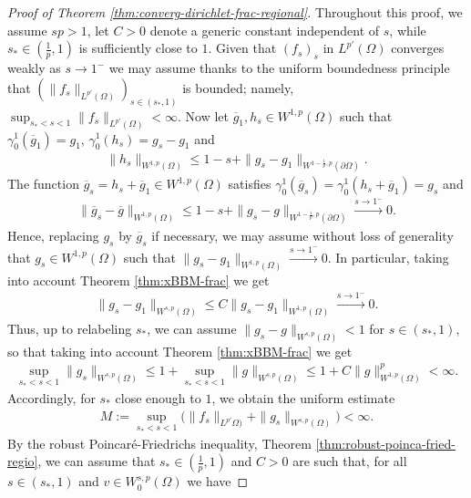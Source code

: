 \documentclass[10pt,a4paper]{amsart}
\begin{document}
\begin{proof}[Proof of Theorem \ref{thm:converg-dirichlet-frac-regional}]
Throughout this proof, we assume $sp>1$, let $C>0$ denote a generic constant independent of $s$, while $s_* \in (\tfrac{1}{p}, 1)$ is sufficiently close to $1$.
Given that  $(f_s)_s$ in $L^{p'}(\Omega)$  converges  weakly as $s\to 1^-$ we may assume thanks to the uniform boundedness principle that $(\|f_s\|_{L^{p'}(\Omega)})_{s\in (s_*,1)}$ is bounded; namely, $\sup_{s_*<s<1} \| f_s\|_{L^{p'}(\Omega)} < \infty.$ Now let $\overline{g}_1, h_s \in W^{1,p}(\Omega)$ such that
$\gamma^1_0(\overline{g}_1)= g_1$, $\gamma^1_0 (h_s)= g_s-g_1$ and
\begin{align*}
\|h_s\|_{W^{1,p}(\Omega)}\leq 1-s+ \|g_s-g_1\|_{W^{1-\frac{1}{p},p}(\partial \Omega)}.
\end{align*}
The function $ \overline{g}_s= h_s +\overline{g}_1\in W^{1,p}(\Omega)$ satisfies  $\gamma^1_0(\overline{g}_s) = \gamma^1_0(h_s+\overline{g}_1) = g_s$  and
\begin{align}\label{eq:gs-frac-extens}
\|\overline{g}_s-\overline{g}\|_{W^{1,p}(\Omega)}\leq 1-s+ \|g_s-g\|_{W^{1-\frac{1}{p},p}(\partial \Omega)}\xrightarrow{s\to1^-}0.
\end{align}
Hence, replacing $g_s$ by $\overline{g}_s$ if necessary, we may assume without loss of generality that $g_s\in W^{1,p}(\Omega)$ such that $\|g_s-g_1 \|_{W^{1,p}(\Omega)}\xrightarrow{s\to1^-}0.$ In particular, taking into account Theorem \ref{thm:xBBM-frac}  we get
\begin{align}\label{eq:xgs-conv-uni}
 \|g_s-g_1 \|_{W^{s,p}(\Omega)}\leq C\|g_s-g_1 \|_{W^{1,p}(\Omega)}\xrightarrow{s\to1^-}0.
\end{align}
Thus, up to relabeling $s_*$, we can assume $\|g_s-g \|_{W^{s,p}(\Omega)}<1$ for $s\in (s_*, 1)$, so that taking into account Theorem \ref{thm:xBBM-frac}  we get
\begin{align*}
\sup_{s_*<s<1}\|g_s \|_{W^{s,p}(\Omega)}\leq 1+ \sup_{s_*<s<1}
\|g \|_{W^{s,p}(\Omega)}\leq 1+  C \|g\|^p_{W^{1,p}(\Omega)}<\infty.
\end{align*}
Accordingly, for $s_*$ close enough to $1$,  we obtain the uniform estimate
\begin{align}\label{eq:uniform-bdd-f-g-D-regio}
M:= 	\sup_{s_*<s<1}\big(\|f_s \|_{L^{p'}\Omega)}+\|g_s \|_{W^{s,p}(\Omega)}\big)<\infty.
\end{align}
By the robust Poincar{\'e}-Friedrichs inequality, Theorem \ref{thm:robust-poinca-fried-regio}, we can assume that $s_* \in (\frac{1}{p},1)$ and $C>0$ are such that, for all $s\in ( s_*,1)$ and $v \in W^{s,p}_0(\Omega)$ we have

\end{proof}
\end{document}
